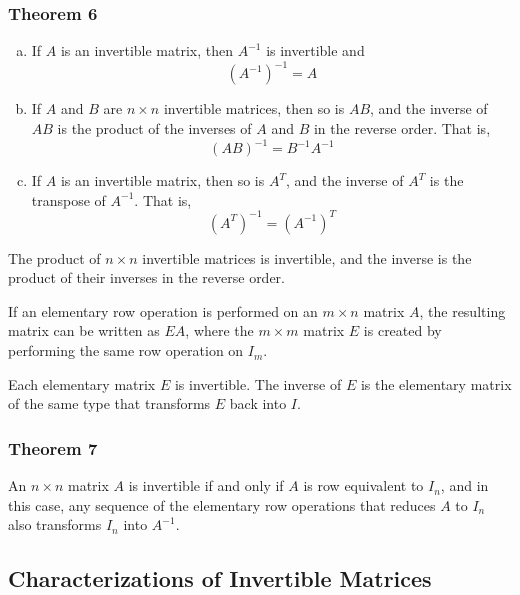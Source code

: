 \documentclass[letterpaper,11pt]{article}
\begin{document}
			\subsubsection{Theorem 6}
				\begin{enumerate}[a.]
					\item If $A$ is an invertible matrix, then $A^{-1}$ is invertible and
						\begin{equation}
							(A^{-1})^{-1}=A
						\end{equation}
					\item If $A$ and $B$ are $n\times n$ invertible matrices, then so is $AB$, and the inverse of $AB$ is the product of the inverses of $A$ and $B$ in the reverse order. That is,
						\begin{equation}
							(AB)^{-1}=B^{-1}A^{-1}
						\end{equation}
					\item If $A$ is an invertible matrix, then so is $A^T$, and the inverse of $A^T$ is the transpose of $A^{-1}$. That is,
						\begin{equation}
							(A^T)^{-1}=(A^{-1})^T
						\end{equation}
				\end{enumerate}
				
				The product of $n\times n$ invertible matrices is invertible, and the inverse is the product of their inverses in the reverse order.
				
				If an elementary row operation is performed on an $m\times n$ matrix $A$, the resulting matrix can be written as $EA$, where the $m\times m$ matrix $E$ is created by performing the same row operation on $I_m$.
				
				Each elementary matrix $E$ is invertible. The inverse of $E$ is the elementary matrix of the same type that transforms $E$ back into $I$.
			\subsubsection{Theorem 7}
				An $n\times n$ matrix $A$ is invertible if and only if $A$ is row equivalent to $I_n$, and in this case, any sequence of the elementary row operations that reduces $A$ to $I_n$ also transforms $I_n$ into $A^{-1}$.
		\subsection{Characterizations of Invertible Matrices}
\end{document}
